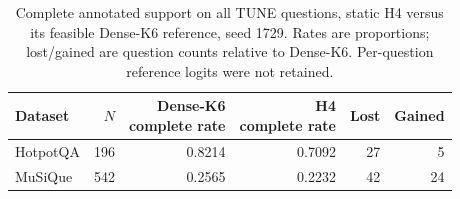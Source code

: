 \begin{table}[!htbp]
\centering\small
\caption{Complete annotated support on all TUNE questions, static H4 versus its feasible Dense-K6 reference, seed 1729. Rates are proportions; lost/gained are question counts relative to Dense-K6. Per-question reference logits were not retained.}\label{tab:reference}
\begin{tabular}{@{}lrrrrr@{}}\toprule
Dataset & $N$ & \shortstack{Dense-K6\\complete rate} & \shortstack{H4\\complete rate} & Lost & Gained \\
\midrule
HotpotQA & 196 & 0.8214 & 0.7092 & 27 & 5 \\
MuSiQue & 542 & 0.2565 & 0.2232 & 42 & 24 \\
\bottomrule\end{tabular}
\end{table}

